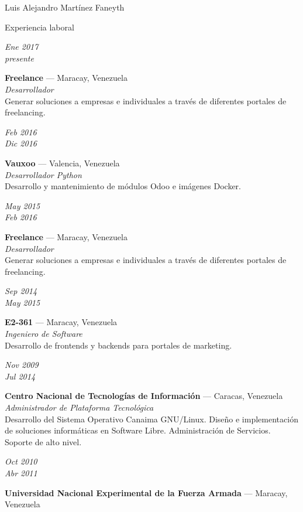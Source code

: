 \documentclass[11pt,letterpaper]{article}
\begin{document}
\begin{cv}{Luis Alejandro Mart\'inez Faneyth}
\begin{cvlist}{Experiencia laboral}
\item[{\parbox[t]{6em}{\textit{\large{Ene 2017\\presente}}}}]{
	\parbox[t]{\linewidth}{
		\textbf{Freelance} --- Maracay, Venezuela\\
		\textit{Desarrollador}\\
		\footnotesize{Generar soluciones a empresas e individuales a trav\'es de diferentes portales de freelancing.}
	}
}
\item[{\parbox[t]{6em}{\textit{\large{Feb 2016\\Dic 2016}}}}]{
	\parbox[t]{\linewidth}{
		\textbf{Vauxoo} --- Valencia, Venezuela\\
		\textit{Desarrollador Python}\\
		\footnotesize{Desarrollo y mantenimiento de m\'odulos Odoo e im\'agenes Docker.}
	}
}
\item[{\parbox[t]{6em}{\textit{\large{May 2015\\Feb 2016}}}}]{
	\parbox[t]{\linewidth}{
		\textbf{Freelance} --- Maracay, Venezuela\\
		\textit{Desarrollador}\\
		\footnotesize{Generar soluciones a empresas e individuales a trav\'es de diferentes portales de freelancing.}
	}
}
\item[{\parbox[t]{6em}{\textit{\large{Sep 2014\\May 2015}}}}]{
	\parbox[t]{\linewidth}{
		\textbf{E2-361} --- Maracay, Venezuela\\
		\textit{Ingeniero de Software}\\
		\footnotesize{Desarrollo de frontends y backends para portales de marketing.}
	}
}
\item[{\parbox[t]{6em}{\textit{\large{Nov 2009\\Jul 2014}}}}]{
	\parbox[t]{\linewidth}{
		\textbf{Centro Nacional de Tecnolog\'ias de Informaci\'on} --- Caracas, Venezuela\\
		\textit{Administrador de Plataforma Tecnol\'ogica}\\
		\footnotesize{Desarrollo del Sistema Operativo Canaima GNU/Linux. Dise\~no e implementaci\'on de soluciones inform\'aticas en Software Libre. Administraci\'on de Servicios. Soporte de alto nivel.}
	}
}
\item[{\parbox[t]{6em}{\textit{\large{Oct 2010\\Abr 2011}}}}]{
	\parbox[t]{\linewidth}{
		\textbf{Universidad Nacional Experimental de la Fuerza Armada} --- Maracay, Venezuela\\
}}
\end{cvlist}
\end{cv}
\end{document}
